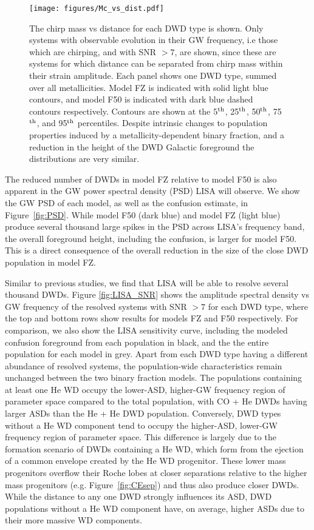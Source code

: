 \documentclass[twocolumn]{aastex631}
\begin{document}
\begin{figure*}
	\texttt{[image: figures/Mc\_vs\_dist.pdf]}
    \caption{The chirp mass vs distance for each DWD type is shown. Only systems with observable evolution in their GW frequency, i.e those which are chirping, and with SNR $>7$, are shown, since these are systems for which distance can be separated from chirp mass within their strain amplitude. Each panel shows one DWD type, summed over all metallicities. Model FZ is indicated with solid light blue contours, and model F50 is indicated with dark blue dashed contours respectively. Contours are shown at the $5^{\rm{th}}$, 25$^{\rm{th}}$, 50$^{\rm{th}}$, 75$^{\rm{th}}$, and 95$^{\rm{th}}$ percentiles. Despite intrinsic changes to population properties induced by a metallicity-dependent binary fraction, and a reduction in the height of the DWD Galactic foreground the distributions are very similar.}
    \label{fig:Mc_vs_dist}
\end{figure*}


The reduced number of DWDs in model FZ relative to model F50 is also apparent in the GW power spectral density (PSD) LISA will observe. We show the GW PSD of each model, as well as the confusion estimate, in Figure~\ref{fig:PSD}. While model F50 (dark blue) and model FZ (light blue) produce several thousand large spikes in the PSD across LISA's frequency band, the overall foreground height, including the confusion, is larger for model F50. This is a direct consequence of the overall reduction in the size of the close DWD population in model FZ. 

Similar to previous studies, we find that LISA will be able to resolve several thousand DWDs. Figure \ref{fig:LISA_SNR} shows the amplitude spectral density vs GW frequency of the resolved systems with SNR $> 7$ for each DWD type, where the top and bottom rows show results for models FZ and F50 respectively. For comparison, we also show the LISA sensitivity curve, including the 
modeled confusion foreground from each population in black, and the the entire population for each model in grey. Apart from each DWD type having a different abundance of resolved systems, the population-wide characteristics remain unchanged between the two binary fraction models. The populations containing at least one He WD occupy the lower-ASD, higher-GW frequency region of parameter space compared to the total population, with CO + He DWDs having larger ASDs than the He + He DWD population. Conversely, DWD types without a He WD component tend to occupy the higher-ASD, lower-GW frequency region of parameter space. This difference is largely due to the formation scenario of DWDs containing a He WD, which form from the ejection of a common envelope created by the He WD progenitor. These lower mass progenitors overflow their Roche lobes at closer separations relative to the higher mass progenitors (e.g. Figure~\ref{fig:CEsep}) and thus also produce closer DWDs. While the distance to any one DWD strongly influences its ASD, DWD populations without a He WD component have, on average, higher ASDs due to their more massive WD components.
\end{document}
